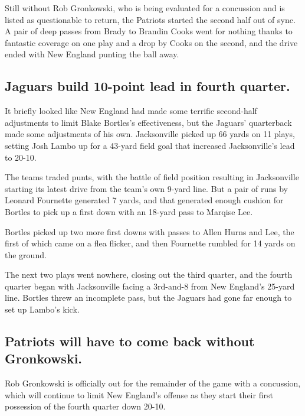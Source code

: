 Still without Rob Gronkowski, who is being evaluated for a concussion
and is listed as questionable to return, the Patriots started the second
half out of sync. A pair of deep passes from Brady to Brandin Cooks went
for nothing thanks to fantastic coverage on one play and a drop by Cooks
on the second, and the drive ended with New England punting the ball
away.

\hypertarget{jaguars-build-10-point-lead-in-fourth-quarter}{%
\subsection{Jaguars build 10-point lead in fourth
quarter.}\label{jaguars-build-10-point-lead-in-fourth-quarter}}

It briefly looked like New England had made some terrific second-half
adjustments to limit Blake Bortles's effectiveness, but the Jaguars'
quarterback made some adjustments of his own. Jacksonville picked up 66
yards on 11 plays, setting Josh Lambo up for a 43-yard field goal that
increased Jacksonville's lead to 20-10.

The teams traded punts, with the battle of field position resulting in
Jacksonville starting its latest drive from the team's own 9-yard line.
But a pair of runs by Leonard Fournette generated 7 yards, and that
generated enough cushion for Bortles to pick up a first down with an
18-yard pass to Marqise Lee.

Bortles picked up two more first downs with passes to Allen Hurns and
Lee, the first of which came on a flea flicker, and then Fournette
rumbled for 14 yards on the ground.

The next two plays went nowhere, closing out the third quarter, and the
fourth quarter began with Jacksonville facing a 3rd-and-8 from New
England's 25-yard line. Bortles threw an incomplete pass, but the
Jaguars had gone far enough to set up Lambo's kick.

\hypertarget{patriots-will-have-to-come-back-without-gronkowski}{%
\subsection{Patriots will have to come back without
Gronkowski.}\label{patriots-will-have-to-come-back-without-gronkowski}}

Rob Gronkowski is officially out for the remainder of the game with a
concussion, which will continue to limit New England's offense as they
start their first possession of the fourth quarter down 20-10.

